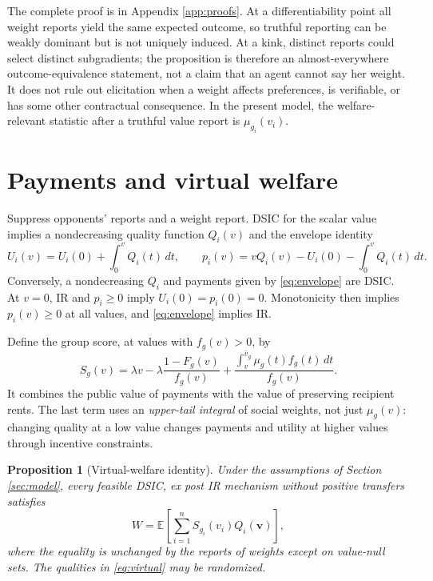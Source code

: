 \documentclass[11pt]{article}
\newtheorem{proposition}{Proposition}
\newcommand{\E}{\mathbb E}
\begin{document}
The complete proof is in Appendix \ref{app:proofs}. At a differentiability point all weight reports yield the same expected outcome, so truthful reporting can be weakly dominant but is not uniquely induced. At a kink, distinct reports could select distinct subgradients; the proposition is therefore an almost-everywhere outcome-equivalence statement, not a claim that an agent cannot say her weight. It does not rule out elicitation when a weight affects preferences, is verifiable, or has some other contractual consequence. In the present model, the welfare-relevant statistic after a truthful value report is $\mu_{g_i}(v_i)$.

\section{Payments and virtual welfare}\label{sec:score}

Suppress opponents' reports and a weight report. DSIC for the scalar value implies a nondecreasing quality function $Q_i(v)$ and the envelope identity
\begin{equation}\label{eq:envelope}
U_i(v)=U_i(0)+\int_0^v Q_i(t)\,dt,
\qquad
p_i(v)=vQ_i(v)-U_i(0)-\int_0^vQ_i(t)\,dt.
\end{equation}
Conversely, a nondecreasing $Q_i$ and payments given by \eqref{eq:envelope} are DSIC. At $v=0$, IR and $p_i\ge0$ imply $U_i(0)=p_i(0)=0$. Monotonicity then implies $p_i(v)\ge0$ at all values, and \eqref{eq:envelope} implies IR.

Define the group score, at values with $f_g(v)>0$, by
\begin{equation}\label{eq:score}
S_g(v)=\lambda v-\lambda\frac{1-F_g(v)}{f_g(v)}
+\frac{\int_v^{\bar v_g}\mu_g(t)f_g(t)\,dt}{f_g(v)}.
\end{equation}
It combines the public value of payments with the value of preserving recipient rents. The last term uses an \emph{upper-tail integral} of social weights, not just $\mu_g(v)$: changing quality at a low value changes payments and utility at higher values through incentive constraints.

\begin{proposition}[Virtual-welfare identity]\label{prop:identity}
Under the assumptions of Section \ref{sec:model}, every feasible DSIC, ex post IR mechanism without positive transfers satisfies
\begin{equation}\label{eq:virtual}
W=\E\!\left[\sum_{i=1}^n S_{g_i}(v_i)Q_i(\mathbf v)\right],
\end{equation}
where the equality is unchanged by the reports of weights except on value-null sets. The qualities in \eqref{eq:virtual} may be randomized.
\end{proposition}
\end{document}
